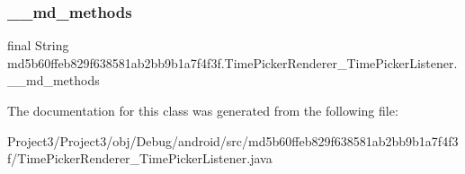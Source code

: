 \subsubsection{\texorpdfstring{\+\_\+\+\_\+md\+\_\+methods}{\_\_md\_methods}}
{\footnotesize\ttfamily final String md5b60ffeb829f638581ab2bb9b1a7f4f3f.\+Time\+Picker\+Renderer\+\_\+\+Time\+Picker\+Listener.\+\_\+\+\_\+md\+\_\+methods\hspace{0.3cm}{\ttfamily [static]}}



The documentation for this class was generated from the following file\+:\begin{DoxyCompactItemize}
\item 
Project3/\+Project3/obj/\+Debug/android/src/md5b60ffeb829f638581ab2bb9b1a7f4f3f/Time\+Picker\+Renderer\+\_\+\+Time\+Picker\+Listener.\+java\end{DoxyCompactItemize}
